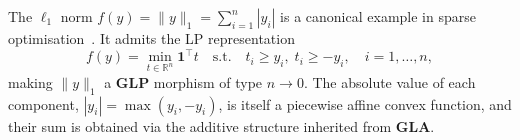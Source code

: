 \begin{example}
  The $\ell_1$ norm $f(y) = \|y\|_1 = \sum_{i=1}^{n} |y_i|$ is a canonical example in sparse optimisation~\cite{boyd2004convex}. It admits the LP representation
  \[
    f(y) = \min_{t \in \mathbb{R}^n} \mathbf{1}^\top t \quad \text{s.t.} \quad t_i \geq y_i,\; t_i \geq -y_i, \quad i = 1,\ldots,n,
  \]
  making $\|y\|_1$ a $\mathbf{GLP}$ morphism of type $n \to 0$. The absolute value of each component, $|y_i| = \max(y_i, -y_i)$, is itself a piecewise affine convex function, and their sum is obtained via the additive structure inherited from $\mathbf{GLA}$.

  \begin{center}
    \vspace{1.5em}
    
    \vspace{1em}
  \end{center}
\end{example}
